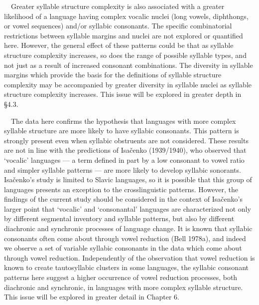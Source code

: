 \documentclass[12pt]{article}
\newenvironment{styleBody}{\renewcommand\baselinestretch{1.0}\setlength\leftskip{0in}\setlength\rightskip{0in plus 1fil}\setlength\parindent{0in}\setlength\parfillskip{0pt plus 1fil}\setlength\parskip{0in plus 1pt}\writerlistparindent\writerlistleftskip\leavevmode\normalfont\normalsize\fontsize{11pt}{13.2pt}\selectfont\mdseries\upshape\writerlistlabel\ignorespaces}{\unskip\vspace{0in plus 1pt}\par}
\newcommand\writerlistleftskip{}
\newcommand\writerlistparindent{}
\newcommand\writerlistlabel{}
\begin{document}
\begin{styleBody}
\ \ Greater syllable structure complexity is also associated with a greater likelihood of a language having complex vocalic nuclei (long vowels, diphthongs, or vowel sequences) and/or syllabic consonants. The specific combinatorial restrictions between syllable margins and nuclei are not explored or quantified here. However, the general effect of these patterns could be that as syllable structure complexity increases, so does the range of possible syllable types, and not just as a result of increased consonant combinations. The diversity in syllable margins which provide the basis for the definitions of syllable structure complexity may be accompanied by greater diversity in syllable nuclei as syllable structure complexity increases. This issue will be explored in greater depth in §4.3.
\end{styleBody}

\begin{styleBody}
\ \ The data here confirms the hypothesis that languages with more complex syllable structure are more likely to have syllabic consonants. This pattern is strongly present even when syllabic obstruents are not considered. These results are not in line with the predictions of Isačenko (1939/1940), who observed that ‘vocalic’ languages — a term defined in part by a low consonant to vowel ratio and simpler syllable patterns — are more likely to develop syllabic sonorants. Isačenko’s study is limited to Slavic languages, so it is possible that this group of languages presents an exception to the crosslinguistic patterns. However, the findings of the current study should be considered in the context of Isačenko’s larger point that ‘vocalic’ and ‘consonantal’ languages are characterized not only by different segmental inventory and syllable patterns, but also by different diachronic and synchronic processes of language change. It is known that syllabic consonants often come about through vowel reduction (Bell 1978a), and indeed we observe a set of variable syllabic consonants in the data which come about through vowel reduction. Independently of the observation that vowel reduction is known to create tautosyllabic clusters in some languages, the syllabic consonant patterns here suggest a higher occurrence of vowel reduction processes, both diachronic and synchronic, in languages with more complex syllable structure. This issue will be explored in greater detail in Chapter 6.
\end{styleBody}
\end{document}
